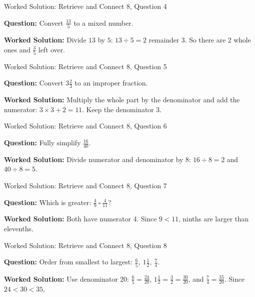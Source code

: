 \documentclass{beamer}
\newcommand{\ashow}[1]{\uncover<2->{\textcolor{red}{\small #1}}}
\begin{document}
\begin{frame}{Worked Solution: Retrieve and Connect 8, Question 4}

\textbf{Question:} Convert $\frac{13}{5}$ to a mixed number.

\textbf{Worked Solution:} Divide $13$ by $5$: $13 \div 5 = 2$ remainder $3$. So there are 2 whole ones and $\frac35$ left over. \ashow{$2\frac35$.}
\end{frame}

\begin{frame}{Worked Solution: Retrieve and Connect 8, Question 5}

\textbf{Question:} Convert $3\frac{2}{3}$ to an improper fraction.

\textbf{Worked Solution:} Multiply the whole part by the denominator and add the numerator: $3\times3+2=11$. Keep the denominator 3. \ashow{$\frac{11}{3}$.}
\end{frame}

\begin{frame}{Worked Solution: Retrieve and Connect 8, Question 6}

\textbf{Question:} Fully simplify $\frac{16}{40}$.

\textbf{Worked Solution:} Divide numerator and denominator by 8: $16 \div 8 = 2$ and $40 \div 8 = 5$. \ashow{$\frac{16}{40}=\frac25$.}
\end{frame}

\begin{frame}{Worked Solution: Retrieve and Connect 8, Question 7}

\textbf{Question:} Which is greater: $\frac{4}{9}\ \square\ \frac{4}{11}$?

\textbf{Worked Solution:} Both have numerator 4. Since $9<11$, ninths are larger than elevenths. \ashow{$\frac49$ is greater.}
\end{frame}

\begin{frame}{Worked Solution: Retrieve and Connect 8, Question 8}

\textbf{Question:} Order from smallest to largest: $\frac{6}{5},\ 1\frac{1}{2},\ \frac{7}{4}$.

\textbf{Worked Solution:} Use denominator 20: $\frac65 = \frac{24}{20}$, $1\frac12 = \frac32 = \frac{30}{20}$, and $\frac74 = \frac{35}{20}$. Since $24<30<35$, \ashow{$\frac65,\ 1\frac12,\ \frac74$.}
\end{frame}
\end{document}
